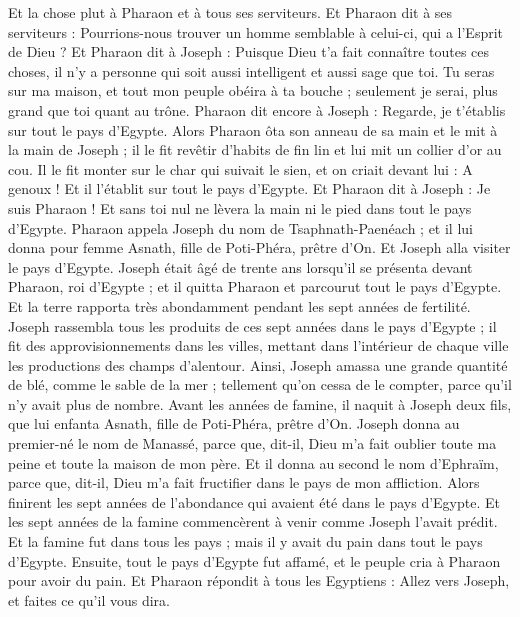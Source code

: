 \begin{multicols}{2}
Et la chose plut à Pharaon et à tous ses serviteurs.
Et Pharaon dit à ses serviteurs : Pourrions-nous trouver un homme semblable à celui-ci, qui a l'Esprit de Dieu ?
Et Pharaon dit à Joseph : Puisque Dieu t'a fait connaître toutes ces choses, il n'y a personne qui soit aussi intelligent et aussi sage que toi.
Tu seras sur ma maison, et tout mon peuple obéira à ta bouche ; seulement je serai, plus grand que toi quant au trône.
Pharaon dit encore à Joseph : Regarde, je t'établis sur tout le pays d'Egypte.
Alors Pharaon ôta son anneau de sa main et le mit à la main de Joseph ; il le fit revêtir d'habits de fin lin et lui mit un collier d'or au cou.
Il le fit monter sur le char qui suivait le sien, et on criait devant lui : A genoux ! Et il l'établit sur tout le pays d'Egypte.
Et Pharaon dit à Joseph : Je suis Pharaon ! Et sans toi nul ne lèvera la main ni le pied dans tout le pays d'Egypte.
Pharaon appela Joseph du nom de Tsaphnath-Paenéach ; et il lui donna pour femme Asnath, fille de Poti-Phéra, prêtre d'On. Et Joseph alla visiter le pays d'Egypte.
Joseph était âgé de trente ans lorsqu'il se présenta devant Pharaon, roi d'Egypte ; et il quitta Pharaon et parcourut tout le pays d'Egypte.
Et la terre rapporta très abondamment pendant les sept années de fertilité.
Joseph rassembla tous les produits de ces sept années dans le pays d'Egypte ; il fit des approvisionnements dans les villes, mettant dans l'intérieur de chaque ville les productions des champs d'alentour.
Ainsi, Joseph amassa une grande quantité de blé, comme le sable de la mer ; tellement qu'on cessa de le compter, parce qu'il n'y avait plus de nombre.
Avant les années de famine, il naquit à Joseph deux fils, que lui enfanta Asnath, fille de Poti-Phéra, prêtre d'On.
Joseph donna au premier-né le nom de Manassé, parce que, dit-il, Dieu m'a fait oublier toute ma peine et toute la maison de mon père.
Et il donna au second le nom d'Ephraïm, parce que, dit-il, Dieu m'a fait fructifier dans le pays de mon affliction.
Alors finirent les sept années de l'abondance qui avaient été dans le pays d'Egypte.
Et les sept années de la famine commencèrent à venir comme Joseph l'avait prédit. Et la famine fut dans tous les pays ; mais il y avait du pain dans tout le pays d'Egypte.
Ensuite, tout le pays d'Egypte fut affamé, et le peuple cria à Pharaon pour avoir du pain. Et Pharaon répondit à tous les Egyptiens : Allez vers Joseph, et faites ce qu'il vous dira.

\end{multicols}
